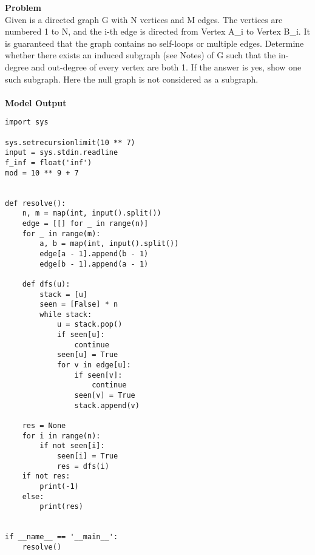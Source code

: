 \begin{figure*}
    \textbf{Problem} \\
    Given is a directed graph G with N vertices and M edges. The vertices are numbered 1 to N, and the i-th edge is directed from Vertex A\_i to Vertex B\_i. It is guaranteed that the graph contains no self-loops or multiple edges. Determine whether there exists an induced subgraph (see Notes) of G such that the in-degree and out-degree of every vertex are both 1. If the answer is yes, show one such subgraph. Here the null graph is not considered as a subgraph.
    \\
     \\
 \textbf{Model Output}
 \begin{small}
 \begin{verbatim}
import sys

sys.setrecursionlimit(10 ** 7)
input = sys.stdin.readline
f_inf = float('inf')
mod = 10 ** 9 + 7


def resolve():
    n, m = map(int, input().split())
    edge = [[] for _ in range(n)]
    for _ in range(m):
        a, b = map(int, input().split())
        edge[a - 1].append(b - 1)
        edge[b - 1].append(a - 1)

    def dfs(u):
        stack = [u]
        seen = [False] * n
        while stack:
            u = stack.pop()
            if seen[u]:
                continue
            seen[u] = True
            for v in edge[u]:
                if seen[v]:
                    continue
                seen[v] = True
                stack.append(v)

    res = None
    for i in range(n):
        if not seen[i]:
            seen[i] = True
            res = dfs(i)
    if not res:
        print(-1)
    else:
        print(res)


if __name__ == '__main__':
    resolve()
\end{verbatim}
\end{small}
    \caption{An example generated by GPT-2 1.5B. The model can sometimes compose function calls.}
    \label{fig:supp_sample_1}
\end{figure*}

